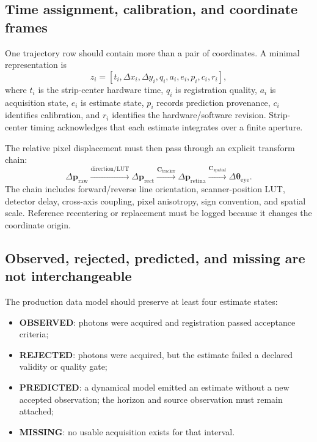 \documentclass[11pt]{article}
\begin{document}
\subsection{Time assignment, calibration, and coordinate frames}

One trajectory row should contain more than a pair of coordinates. A minimal representation is
\[
  z_i =
  \left[t_i,\Delta x_i,\Delta y_i,q_i,a_i,e_i,p_i,c_i,r_i\right],
\]
where $t_i$ is the strip-center hardware time, $q_i$ is registration quality, $a_i$ is acquisition
state, $e_i$ is estimate state, $p_i$ records prediction provenance, $c_i$ identifies calibration,
and $r_i$ identifies the hardware/software revision. Strip-center timing acknowledges that each
estimate integrates over a finite aperture.

The relative pixel displacement must then pass through an explicit transform chain:
\[
  \Delta \mathbf p_{\mathrm{raw}}
  \xrightarrow{\text{direction/LUT}}
  \Delta \mathbf p_{\mathrm{rect}}
  \xrightarrow{\mathbf C_{\mathrm{tracker}}}
  \Delta \mathbf p_{\mathrm{retina}}
  \xrightarrow{\mathbf C_{\mathrm{spatial}}}
  \Delta \boldsymbol\theta_{\mathrm{eye}}.
\]
The chain includes forward/reverse line orientation, scanner-position LUT, detector delay,
cross-axis coupling, pixel anisotropy, sign convention, and spatial scale. Reference recentering or
replacement must be logged because it changes the coordinate origin.

\subsection{Observed, rejected, predicted, and missing are not interchangeable}

The production data model should preserve at least four estimate states:

\begin{itemize}
  \item \textbf{OBSERVED}: photons were acquired and registration passed acceptance criteria;
  \item \textbf{REJECTED}: photons were acquired, but the estimate failed a declared validity or
  quality gate;
  \item \textbf{PREDICTED}: a dynamical model emitted an estimate without a new accepted
  observation; the horizon and source observation must remain attached;
  \item \textbf{MISSING}: no usable acquisition exists for that interval.
\end{itemize}
\end{document}
